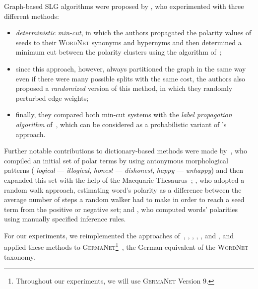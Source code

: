 Graph-based SLG algorithms were proposed by \citet{Rao:09}, who
experimented with three different methods:
\begin{itemize}
\item\emph{deterministic min-cut}, in which the authors propagated the
  polarity values of seeds to their \textsc{WordNet} synonyms and
  hypernyms and then determined a minimum cut between the polarity
  clusters using the algorithm of~\citet{Blum:01};
\item since this approach, however, always partitioned the graph in
  the same way even if there were many possible splits with the same
  cost, the authors also proposed a \emph{randomized} version of this
  method, in which they randomly perturbed edge weights;
\item finally, they compared both min-cut systems with the \emph{label
  propagation algorithm} of~\citet{Zhu:02}, which can be considered as
  a probabilistic variant of \citeauthor{Blair-Goldensohn:08}'s
  approach.
\end{itemize}

Further notable contributions to dictionary-based methods were made
by~\citet{Mohammad:09}, who compiled an initial set of polar terms by
using antonymous morphological patterns (\eg{} \emph{logical} ---
\emph{illogical}, \emph{honest} --- \emph{dishonest}, \emph{happy} ---
\emph{unhappy}) and then expanded this set with the help of the
Macquarie Thesaurus~\cite{Bernard:86}; \citet{Awadallah:10}, who
adopted a random walk approach, estimating word's polarity as a
difference between the average number of steps a random walker had to
make in order to reach a seed term from the positive or negative set;
and \citet{Dragut:10}, who computed words' polarities using manually
specified inference rules.


For our experiments, we reimplemented the approaches of~\citet{Hu:04},
\citet{Blair-Goldensohn:08}, \citet{Kim:04,Kim:06}, \citet{Esuli:06c},
\citet{Rao:09}, and \citet{Awadallah:10}, and applied these methods to
\textsc{GermaNet}\footnote{Throughout our experiments, we will use
  \textsc{GermaNet} Version 9.}~\cite{Hamp:97}, the German equivalent
of the \textsc{WordNet} taxonomy.

